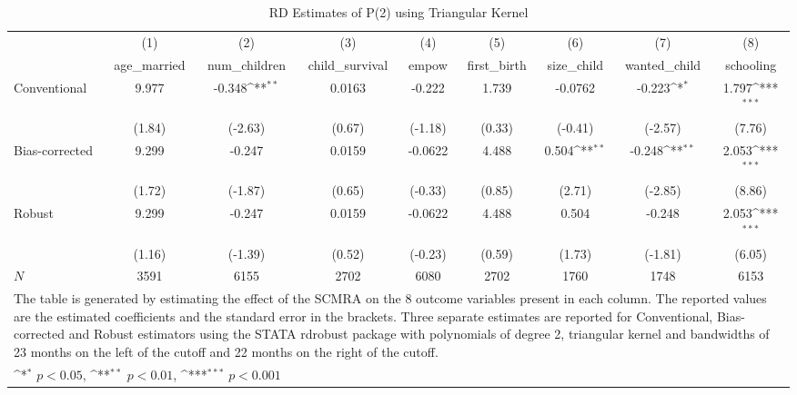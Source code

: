 \begin{table}[htbp]\centering
\def\sym#1{\ifmmode^{#1}\else\(^{#1}\)\fi}
\caption{RD Estimates of P(2) using Triangular Kernel}
\begin{tabular}{l*{8}{c}}
\toprule
            &\multicolumn{1}{c}{(1)}&\multicolumn{1}{c}{(2)}&\multicolumn{1}{c}{(3)}&\multicolumn{1}{c}{(4)}&\multicolumn{1}{c}{(5)}&\multicolumn{1}{c}{(6)}&\multicolumn{1}{c}{(7)}&\multicolumn{1}{c}{(8)}\\
            &\multicolumn{1}{c}{age\_married}&\multicolumn{1}{c}{num\_children}&\multicolumn{1}{c}{child\_survival}&\multicolumn{1}{c}{empow}&\multicolumn{1}{c}{first\_birth}&\multicolumn{1}{c}{size\_child}&\multicolumn{1}{c}{wanted\_child}&\multicolumn{1}{c}{schooling}\\
\midrule
Conventional&       9.977         &      -0.348\sym{**} &      0.0163         &      -0.222         &       1.739         &     -0.0762         &      -0.223\sym{*}  &       1.797\sym{***}\\
            &      (1.84)         &     (-2.63)         &      (0.67)         &     (-1.18)         &      (0.33)         &     (-0.41)         &     (-2.57)         &      (7.76)         \\
\addlinespace
Bias-corrected&       9.299         &      -0.247         &      0.0159         &     -0.0622         &       4.488         &       0.504\sym{**} &      -0.248\sym{**} &       2.053\sym{***}\\
            &      (1.72)         &     (-1.87)         &      (0.65)         &     (-0.33)         &      (0.85)         &      (2.71)         &     (-2.85)         &      (8.86)         \\
\addlinespace
Robust      &       9.299         &      -0.247         &      0.0159         &     -0.0622         &       4.488         &       0.504         &      -0.248         &       2.053\sym{***}\\
            &      (1.16)         &     (-1.39)         &      (0.52)         &     (-0.23)         &      (0.59)         &      (1.73)         &     (-1.81)         &      (6.05)         \\
\midrule
\(N\)       &        3591         &        6155         &        2702         &        6080         &        2702         &        1760         &        1748         &        6153         \\
\bottomrule
\multicolumn{9}{l}{\footnotesize The table is generated by estimating the effect of the SCMRA on the 8 outcome variables present in each column. The reported values are the estimated coefficients and the standard error in the brackets. Three separate estimates are reported for Conventional, Bias-corrected and Robust estimators using the STATA rdrobust package with polynomials of degree 2, triangular kernel and bandwidths of 23 months on the left of the cutoff and 22 months on the right of the cutoff.}\\
\multicolumn{9}{l}{\footnotesize \sym{*} \(p<0.05\), \sym{**} \(p<0.01\), \sym{***} \(p<0.001\)}\\
\end{tabular}
\end{table}
